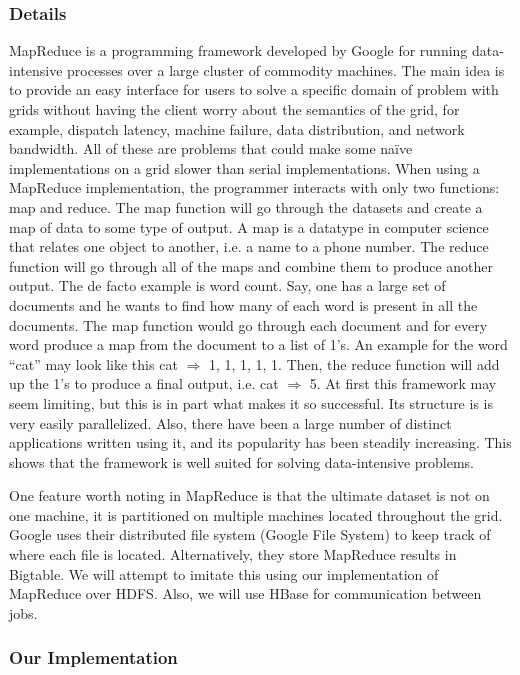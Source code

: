\documentclass{rspublic}
\begin{document}
\subsubsection{Details}

MapReduce is a programming framework developed by Google for running
data-intensive processes over a large cluster of commodity machines.
The main idea is to provide an easy interface for users to solve a
specific domain of problem with grids without having the client worry 
about the semantics of the grid, for example, dispatch latency, machine
failure, data distribution, and network bandwidth.  All of these are
problems that could make some naïve implementations on a grid slower
than serial implementations.  When using a MapReduce implementation,
the programmer interacts with only two functions: map and reduce.  
The map function will go through the datasets and create a map of data
to some type of output.  A map is a datatype in computer science that
relates one object to another, i.e. a name to a phone number.  The reduce
function will go through all of the maps and combine them to produce
another output.  The de facto example is word count.  Say, one has a
large set of documents and he wants to find how many of each word is
present in all the documents.  The map function would go through each
document and for every word produce a map from the document to a list
of 1’s.  An example for the word “cat” may look like this cat $\Rightarrow$ 1, 1,
1, 1, 1.  Then, the reduce function will add up the 1’s to produce a
final output, i.e. cat $\Rightarrow$ 5.  At first this framework may seem limiting,
but this is in part what makes it so successful.  Its structure is 
is very easily parallelized.   Also, there have been a large number
of distinct applications written using it, and its popularity has been
steadily increasing.  This shows that the framework is well suited for
solving data-intensive problems.

One feature worth noting in MapReduce is that the ultimate dataset is not 
on one machine, it is partitioned on multiple machines located throughout the 
grid. Google uses their distributed file system (Google File System) to keep 
track of where each file is located.  Alternatively, they store MapReduce 
results in Bigtable.  We will attempt to imitate this using our implementation
of MapReduce over HDFS.  Also, we will use HBase for communication between jobs.

\subsubsection{Our Implementation} 
\end{document}

